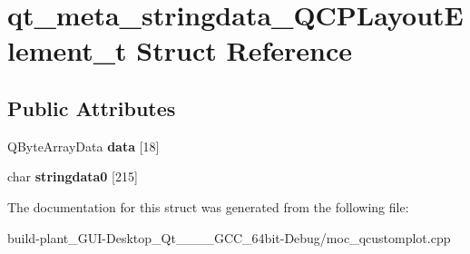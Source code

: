 \hypertarget{structqt__meta__stringdata__QCPLayoutElement__t}{}\section{qt\+\_\+meta\+\_\+stringdata\+\_\+\+Q\+C\+P\+Layout\+Element\+\_\+t Struct Reference}
\label{structqt__meta__stringdata__QCPLayoutElement__t}
\subsection*{Public Attributes}
\begin{DoxyCompactItemize}
\item 
\mbox{\label{structqt__meta__stringdata__QCPLayoutElement__t_aa6e9ae146c405cc7662ce88d1aaa7569}} 
Q\+Byte\+Array\+Data {\bfseries data} \mbox{[}18\mbox{]}
\item 
\mbox{\label{structqt__meta__stringdata__QCPLayoutElement__t_a52a85794683573e29541c60c3cd4eefb}} 
char {\bfseries stringdata0} \mbox{[}215\mbox{]}
\end{DoxyCompactItemize}


The documentation for this struct was generated from the following file\+:\begin{DoxyCompactItemize}
\item 
build-\/plant\+\_\+\+G\+U\+I-\/\+Desktop\+\_\+\+Qt\+\_\+\_\+\_\+\_\+\+G\+C\+C\+\_\+64bit-\/\+Debug/moc\+\_\+qcustomplot.\+cpp\end{DoxyCompactItemize}
